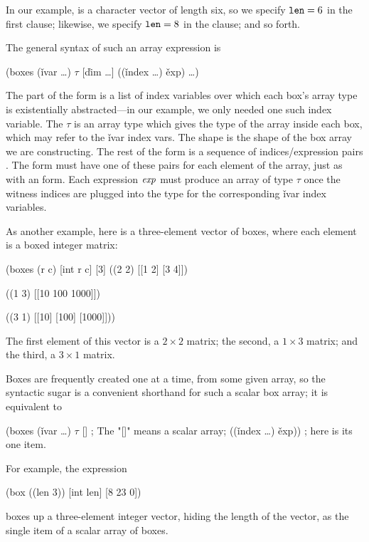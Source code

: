 In our example,  is a character vector of length six,
so we specify $\ex{len} = 6$ in the first clause;
likewise, we specify $\ex{len} = 8$ in the  clause;
and so forth.

The general syntax of such an array expression is
\begin{code}
(boxes (\v{ivar} \ldots) \(\tau\) [\v{dim} \ldots]
  ((\v{index} \ldots) \v{exp}) \ldots)\end{code}
The  part of the form is a list of index
variables over which each box's array type is existentially
abstracted---in our example, we only needed one such index variable.
The $\tau$ is an array type which gives the type of the array
inside each box, which may refer to the \v{ivar} index vars.
The shape  is the shape of the box
array we are constructing.
The rest of the form is a sequence of indices/expression pairs
.
The form must have one of these pairs for each element of the array,
just as with an  form.
Each expression $\mathit{exp}$ must produce an array of type $\tau$
once the witness indices are plugged into the type for the
corresponding \v{ivar} index variables.
  
As another example, here is a three-element vector of boxes,
where each element is a boxed integer matrix:
\begin{code}
(boxes (r c) [int r c] [3]
  ((2 2) [[1 2]
          [3 4]])

  ((1 3) [[10 100 1000]])
  
  ((3 1) [[10] [100] [1000]]))\end{code}

The first element of this vector is a $2 \times 2$ matrix;
the second, a $1 \times 3$ matrix;
and the third, a $3 \times 1$ matrix.

Boxes are frequently created one at a time, from some given array,
so the syntactic sugar
is a convenient shorthand for such a scalar box array;
it is equivalent to
\begin{code}
(boxes (\v{ivar} \ldots) \(\tau\) []  ; The "[]" means a scalar array;
  ((\v{index} \ldots) \v{exp}))    ; here is its one item.\end{code}
For example, the expression
\begin{code}
(box ((len 3)) [int len] [8 23 0])\end{code}
boxes up a three-element integer vector, hiding the length of the
vector, as the single item of a scalar array of boxes.

